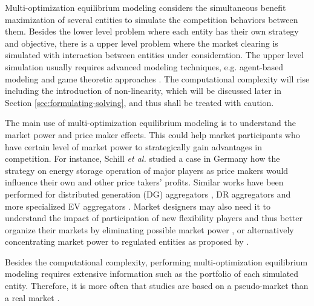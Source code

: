 Multi-optimization equilibrium modeling considers the simultaneous benefit maximization of several entities to simulate the competition behaviors between them. Besides the lower level problem where each entity has their own strategy and objective, there is a upper level problem where the market clearing is simulated with interaction between entities under consideration. The upper level simulation usually requires advanced modeling techniques, e.g. agent-based modeling \cite{Yousefi2011,Dallinger2012,Zheng2014} and game theoretic approaches \cite{Schill2011,Gkatzikis2013,Lin2014,Kardakos2013}. The computational complexity will rise including the introduction of non-linearity, which will be discussed later in Section \ref{sec:formulating-solving}, and thus shall be treated with caution. 

The main use of multi-optimization equilibrium modeling is to understand the market power and price maker effects. This could help market participants who have certain level of market power to strategically gain advantages in competition. For instance, Schill \textit{et al.} \cite{Schill2011} studied a case in Germany how the strategy on energy storage operation of major players as price makers would influence their own and other price takers' profits. Similar works have been performed for distributed generation (DG) aggregators \cite{Zhang2016}, DR aggregators \cite{HenriquezAuba2017} and more specialized EV aggregators \cite{Shafie-Khah2015}. Market designers may also need it to understand the impact of participation of new flexibility players and thus better organize their markets by eliminating possible market power \cite{Mohsenian-Rad2016,Vespermann2017,Huang2017}, or alternatively concentrating market power to regulated entities as proposed by \cite{He2012}.

Besides the computational complexity, performing multi-optimization equilibrium modeling requires extensive information such as the portfolio of each simulated entity. Therefore, it is more often that studies are based on a pseudo-market  \cite{Kardakos2013,Shafie-Khah2015,HenriquezAuba2017} than a real market \cite{Schill2011}.



